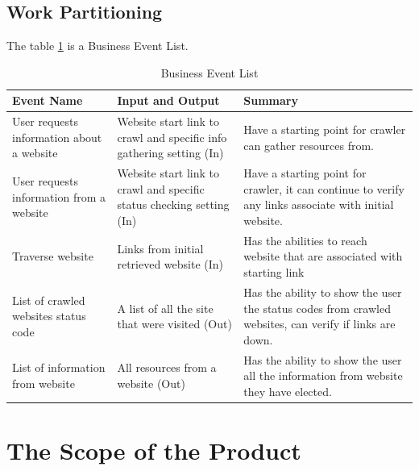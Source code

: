\documentclass[titlepage]{article}
\begin{document}
\subsection*{Work Partitioning}
The table \ref{table:Business Event List} is a Business Event List.

\begin{table}[H]
    \begin{tabular}{| p{5cm} | p{5cm} | p{5cm} |}    \hline
    Event Name &	Input and Output	 & Summary\\ \hline
    User requests information about a website	& Website start link to crawl and specific info gathering setting (In)	& Have a starting point for crawler can gather resources from. \\ \hline
    User requests information from a website	 & Website start link to crawl and specific status checking setting (In)	& Have a starting point for crawler, it can continue to verify any links associate with initial website.\\ \hline
    Traverse website	& Links from initial retrieved website (In)	& Has the abilities to reach website that are associated with starting link \\ \hline
    
    List of crawled websites status code & 	A list of all the site that were visited (Out)	& Has the ability to show the user the status codes from crawled websites, can verify if links are down. \\ \hline
     
      List of information from website	& All resources from a website (Out)	& Has the ability to show the user all the information from website they have elected. \\ \hline
      
    \end{tabular}
    \caption{Business Event List}
\label{table:Business Event List}
\end{table}
\lipsum[7]


\section{The Scope of the Product}
\end{document}
